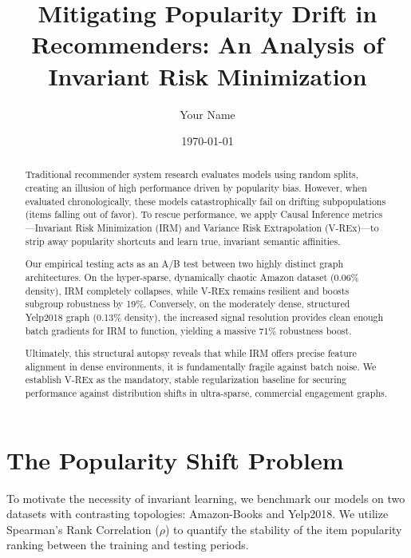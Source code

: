 \documentclass{article}
\title{Mitigating Popularity Drift in Recommenders: An Analysis of Invariant Risk Minimization}
\author{Your Name}
\date{\today}
\begin{document}
\maketitle

\begin{abstract}
Traditional recommender system research evaluates models using random splits, creating an illusion of high performance driven by popularity bias. However, when evaluated chronologically, these models catastrophically fail on drifting subpopulations (items falling out of favor). To rescue performance, we apply Causal Inference metrics---Invariant Risk Minimization (IRM) and Variance Risk Extrapolation (V-REx)---to strip away popularity shortcuts and learn true, invariant semantic affinities. 

Our empirical testing acts as an A/B test between two highly distinct graph architectures. On the hyper-sparse, dynamically chaotic Amazon dataset (0.06\% density), IRM completely collapses, while V-REx remains resilient and boosts subgroup robustness by 19\%. Conversely, on the moderately dense, structured Yelp2018 graph (0.13\% density), the increased signal resolution provides clean enough batch gradients for IRM to function, yielding a massive 71\% robustness boost. 

Ultimately, this structural autopsy reveals that while IRM offers precise feature alignment in dense environments, it is fundamentally fragile against batch noise. We establish V-REx as the mandatory, stable regularization baseline for securing performance against distribution shifts in ultra-sparse, commercial engagement graphs.
\end{abstract}

\section{The Popularity Shift Problem}
To motivate the necessity of invariant learning, we benchmark our models on two datasets with contrasting topologies: Amazon-Books and Yelp2018. We utilize Spearman's Rank Correlation ($\rho$) to quantify the stability of the item popularity ranking between the training and testing periods.
\end{document}
